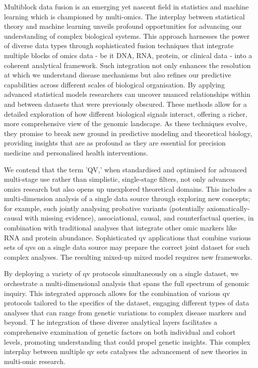 Multiblock data fusion is an emerging yet nascent field in statistics and machine learning  which is championed by multi-omics. 
The interplay between statistical theory and machine learning unveils profound opportunities for advancing our understanding of complex biological systems.
This approach harnesses the power of diverse data types through sophisticated fusion techniques that integrate multiple blocks of omics data - be it DNA, RNA, protein, or clinical data - into a coherent analytical framework. 
Such integration not only enhances the resolution at which we understand disease mechanisms but also refines our predictive capabilities across different scales of biological organisation. 
By applying advanced statistical models 
researchers can uncover nuanced relationships within and between datasets that were previously obscured. 
These methods allow for a detailed exploration of how different biological signals interact, offering a richer, more comprehensive view of the genomic landscape. 
As these techniques evolve, they promise to break new ground in predictive modeling and theoretical biology, providing insights that are as profound as they are essential for precision medicine and personalised health interventions.

We contend that the term 'QV,' when standardised and optimised for advanced multi-stage use rather than simplistic, single-stage filters, not only advances omics research but also opens up unexplored theoretical domains. 
This includes a multi-dimension analysis of a single data source through exploring new concepts; for example, such jointly analysing probative variants (potentially axiomatically-causal with missing evidence), 
associational, causal, and counterfactual queries, in combination with traditional analyses that integrate other omic markers like RNA and protein abundance.
Sophisticated \ac{qv} applications that combine various sets of \ac{qv}s on a single data source may prepare the correct joint dataset for such complex analyses.
The resulting mixed-up mixed model requires new frameworks.

By deploying a variety of \ac{qv} protocols simultaneously on a single dataset, we orchestrate a multi-dimensional analysis that spans the full spectrum of genomic inquiry. This integrated approach allows for the combination of various \ac{qv} protocols tailored to the specifics of the dataset, engaging different types of data analyses that can range from genetic variations to complex disease markers and beyond. T
he integration of these diverse analytical layers facilitates a comprehensive examination of genetic factors on both individual and cohort levels, promoting understanding that could propel genetic insights. This complex interplay between multiple \ac{qv} sets catalyses the advancement of new theories in multi-omic research.

